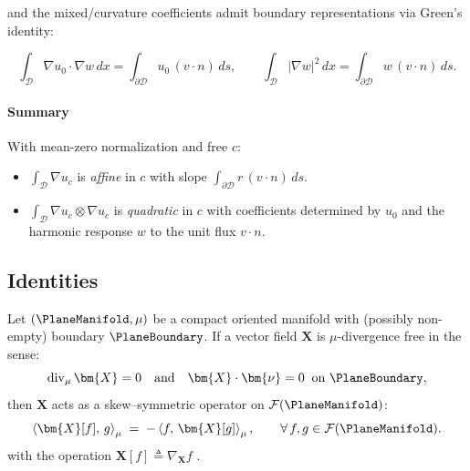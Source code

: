 and the mixed/curvature coefficients admit boundary representations via Green’s identity:

$$
\int_{\mathscr D}\nabla u_0\cdot \nabla w\,dx
= \int_{\partial\mathscr D} u_0\,(v\!\cdot n)\,ds,\qquad
\int_{\mathscr D}|\nabla w|^2\,dx
= \int_{\partial\mathscr D} w\,(v\!\cdot n)\,ds.
$$

\paragraph{Summary}
With mean-zero normalization and free $c$:
\begin{itemize}
\item $\displaystyle \int_{\mathscr D}\nabla u_c$ is \emph{affine} in $c$ with slope $ \int_{\partial\mathscr D} r\,(v\!\cdot n)\,ds$.
\item $\displaystyle \int_{\mathscr D}\nabla u_c\otimes\nabla u_c$ is \emph{quadratic} in $c$ with coefficients determined by $u_0$ and the harmonic response $w$ to the unit flux $v\!\cdot n$.
\end{itemize}
\fi

\subsection{Identities}


%

\begin{proposition}
\label{prop:div-skew}
Let $(\PlaneManifold,\mu)$ be a compact oriented manifold with (possibly non-empty) boundary $\PlaneBoundary$.  
If a vector field $\bm{X}$ is $\mu$-divergence free in the sense:
\[
\operatorname{div}_{\mu} \bm{X} = 0
\quad\text{and}\quad
\bm{X}\cdot\bm{\nu} = 0 \;\; \text{on } \PlaneBoundary,
\]
then $\bm{X}$ acts as a skew–symmetric operator on $\mathcal{F}(\PlaneManifold)$:
\[
\left< \bm{X}[f],\,g\right>_\mu \;=\; - \left<f,\,\bm{X}[g]\right>_{\mu} ,
\qquad\forall\,f,g\in\mathcal F(\PlaneManifold).
\]
with the operation \(\bm{X}[f] \triangleq \nabla_{\bm{X}} f\) .
\end{proposition}

